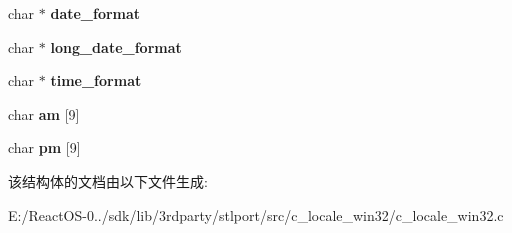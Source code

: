 \begin{DoxyCompactItemize}
\mbox{\label{struct___locale__time_a3f20c32f7be22200b3509fa8a069f28e}} 
char $\ast$ {\bfseries date\+\_\+format}
\item 
\mbox{\label{struct___locale__time_ab4aa03521b766c019eaaeb62df45a938}} 
char $\ast$ {\bfseries long\+\_\+date\+\_\+format}
\item 
\mbox{\label{struct___locale__time_a46296027f89f110982f20b3808f4490c}} 
char $\ast$ {\bfseries time\+\_\+format}
\item 
\mbox{\label{struct___locale__time_a96834c42792e9d753dd641bae99eb4d6}} 
char {\bfseries am} \mbox{[}9\mbox{]}
\item 
\mbox{\label{struct___locale__time_aa2cd4e4e1c34559e49a7ce410063dfe6}} 
char {\bfseries pm} \mbox{[}9\mbox{]}
\end{DoxyCompactItemize}


该结构体的文档由以下文件生成\+:\begin{DoxyCompactItemize}
\item 
E\+:/\+React\+O\+S-\/0../sdk/lib/3rdparty/stlport/src/c\+\_\+locale\+\_\+win32/c\+\_\+locale\+\_\+win32.\+c\end{DoxyCompactItemize}
